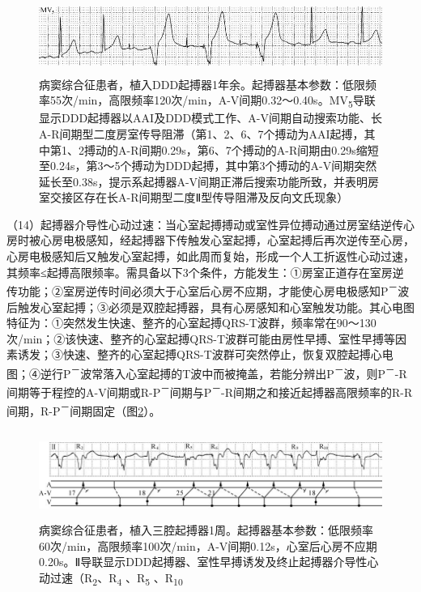 \begin{figure}[!htbp]
 \centering
 \includegraphics[width=5.58333in,height=0.94792in]{./images/Image00614.jpg}
 \captionsetup{justification=centering}
 \caption{病窦综合征患者，植入DDD起搏器1年余。起搏器基本参数：低限频率55次/min，高限频率120次/min，A-V间期0.32～0.40s。MV\textsubscript{5}导联显示DDD起搏器以AAI及DDD模式工作、A-V间期自动搜索功能、长A-R间期型二度房室传导阻滞（第1、2、6、7个搏动为AAI起搏，其中第1、2搏动的A-R间期0.29s，第6、7个搏动的A-R间期由0.29s缩短至0.24s，第3～5个搏动为DDD起搏，其中第3个搏动的A-V间期突然延长至0.38s，提示系起搏器A-V间期正滞后搜索功能所致，并表明房室交接区存在长A-R间期型二度Ⅱ型传导阻滞及反向文氏现象）}
 \label{fig38-11}
  \end{figure} 


（14）起搏器介导性心动过速：当心室起搏搏动或室性异位搏动通过房室结逆传心房时被心房电极感知，经起搏器下传触发心室起搏，心室起搏后再次逆传至心房，心房电极感知后又触发心室起搏，如此周而复始，形成一个人工折返性心动过速，其频率≤起搏高限频率。需具备以下3个条件，方能发生：①房室正道存在室房逆传功能；②室房逆传时间必须大于心室后心房不应期，才能使心房电极感知P\textsuperscript{－}波后触发心室起搏；③必须是双腔起搏器，具有心房感知和心室触发功能。其心电图特征为：①突然发生快速、整齐的心室起搏QRS-T波群，频率常在90～130次/min；②该快速、整齐的心室起搏QRS-T波群可能由房性早搏、室性早搏等因素诱发；③快速、整齐的心室起搏QRS-T波群可突然停止，恢复双腔起搏心电图；④逆行P\textsuperscript{－}波常落入心室起搏的T波中而被掩盖，若能分辨出P\textsuperscript{－}波，则P\textsuperscript{－}-R间期等于程控的A-V间期或R-P\textsuperscript{－}间期与P\textsuperscript{－}-R间期之和接近起搏器高限频率的R-R间期，R-P\textsuperscript{－}间期固定（图\ref{fig38-12}）。

\begin{figure}[!htbp]
 \centering
 \includegraphics[width=5.80208in,height=1.13542in]{./images/Image00615.jpg}
 \captionsetup{justification=centering}
 \caption{病窦综合征患者，植入三腔起搏器1周。起搏器基本参数：低限频率60次/min，高限频率100次/min，A-V间期0.12s，心室后心房不应期0.20s。Ⅱ导联显示DDD起搏器、室性早搏诱发及终止起搏器介导性心动过速（R\textsubscript{2}、R\textsubscript{4} 、R\textsubscript{5} 、R\textsubscript{10}}
 \label{fig38-12}
  \end{figure} 

